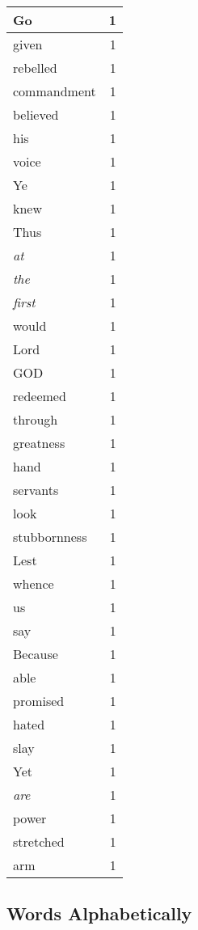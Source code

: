 \begin{center}
\begin{longtable}{l|r}
Go & 1 \\ \hline
given & 1 \\ \hline
rebelled & 1 \\ \hline
commandment & 1 \\ \hline
believed & 1 \\ \hline
his & 1 \\ \hline
voice & 1 \\ \hline
Ye & 1 \\ \hline
knew & 1 \\ \hline
Thus & 1 \\ \hline
\emph{at} & 1 \\ \hline
\emph{the} & 1 \\ \hline
\emph{first} & 1 \\ \hline
would & 1 \\ \hline
Lord & 1 \\ \hline
GOD & 1 \\ \hline
redeemed & 1 \\ \hline
through & 1 \\ \hline
greatness & 1 \\ \hline
hand & 1 \\ \hline
servants & 1 \\ \hline
look & 1 \\ \hline
stubbornness & 1 \\ \hline
Lest & 1 \\ \hline
whence & 1 \\ \hline
us & 1 \\ \hline
say & 1 \\ \hline
Because & 1 \\ \hline
able & 1 \\ \hline
promised & 1 \\ \hline
hated & 1 \\ \hline
slay & 1 \\ \hline
Yet & 1 \\ \hline
\emph{are} & 1 \\ \hline
power & 1 \\ \hline
stretched & 1 \\ \hline
arm & 1 \\ \hline
\end{longtable}
\end{center}



\normalsize



\subsection{Words Alphabetically}

